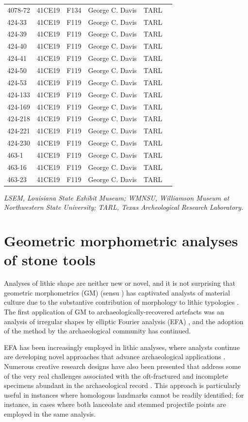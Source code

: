 \documentclass[review]{elsarticle}
\begin{document}
\begin{center}
\begin{longtable}{lccccc}
		4078-72 & 41CE19 & F134 & George C. Davis & TARL\\
		424-33 & 41CE19 & F119 & George C. Davis & TARL\\
		424-39 & 41CE19 & F119 & George C. Davis & TARL\\
		424-40 & 41CE19 & F119 & George C. Davis & TARL\\
		424-41 & 41CE19 & F119 & George C. Davis & TARL\\
		424-50 & 41CE19 & F119 & George C. Davis & TARL\\
		424-53 & 41CE19 & F119 & George C. Davis & TARL\\
		424-133 & 41CE19 & F119 & George C. Davis & TARL\\
		424-169 & 41CE19 & F119 & George C. Davis & TARL\\
		424-218 & 41CE19 & F119 & George C. Davis & TARL\\
		424-221 & 41CE19 & F119 & George C. Davis & TARL\\
		424-230 & 41CE19 & F119 & George C. Davis & TARL\\
		463-1 & 41CE19 & F119 & George C. Davis & TARL\\
		463-16 & 41CE19 & F119 & George C. Davis & TARL\\
		463-23 & 41CE19 & F119 & George C. Davis & TARL\\
\end{longtable}
\textit{LSEM, Louisiana State Exhibit Museum; WMNSU, Williamson Museum at Northwestern State University; TARL, Texas Archeological Research Laboratory.}
\end{center}

\section{Geometric morphometric analyses of stone tools}

Analyses of lithic shape are neither new or novel, and it is not surprising that geometric morphometrics (GM) (sensu \citet{RN11559}) has captivated analysts of material culture due to the substantive contribution of morphology to lithic typologies \citep{RN11529,RN11528,RN11534}. The first application of GM to archaeologically-recovered artefacts was an analysis of irregular shapes by elliptic Fourier analysis (EFA) \citep{RN4379}, and the adoption of the method by the archaeological community has continued.

EFA has been increasingly employed in lithic analyses, where analysts continue are developing novel approaches that advance archaeological applications \citep{RN11556,RN11529,RN4350,RN4373,RN4338,RN4353,RN11521,RN4143,RN253,RN11534}. Numerous creative research designs have also been presented that address some of the very real challenges associated with the oft-fractured and incomplete specimens abundant in the archaeological record \citep{RN11575,RN11574,RN11539,RN11533}. This approach is particularly useful in instances where homologous landmarks cannot be readily identified; for instance, in cases where both lanceolate and stemmed projectile points are employed in the same analysis.
\end{document}
